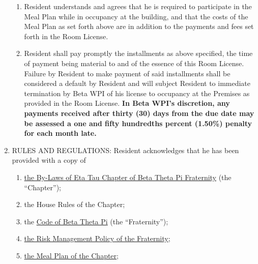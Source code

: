 \documentclass[12pt]{article}
\begin{document}
\begin{enumerate}
\begin{enumerate}[label=\Alph*.]
         \item Resident understands and agrees that he is required to participate in the Meal Plan while in occupancy at the building, and that the costs of the Meal Plan as set forth above are in addition to the payments and fees set forth in the Room License.

        \item Resident shall pay promptly the installments as above specified, the time of payment being material to and of the essence of this Room License.
Failure by Resident to make payment of said installments shall be considered a default by Resident and will subject Resident to immediate termination by Beta WPI of his license to occupancy at the Premises as provided in the Room License.
\textbf{In Beta WPI's discretion, any payments received after thirty (30) days from the due date may be assessed a one and fifty hundredths percent (1.50\%) penalty for each month late.}

\end{enumerate}

\item\label{itm:rules}

RULES AND REGULATIONS\@: Resident acknowledges that he has been provided with a copy of

\begin{enumerate}[label=\arabic*)]

        \item \href{https://docs.google.com/document/d/19zC4bDC3ZrdCWqLJ8Y0Z35mJEEDPLed1o6GGvX5XCGw/edit?usp=sharing} {the By-Laws of Eta Tau Chapter of Beta Theta Pi Fraternity} (the ``Chapter'');

        \item the House Rules of the Chapter;

        \item the \href{https://beta.org/wp-content/uploads/2020/08/Code-of-Beta-Theta-Pi_08.13.2020.pdf}{Code of Beta Theta Pi} (the ``Fraternity'');

        \item \href{https://beta.org/wp-content/uploads/2020/08/Beta-Theta-Pi-Risk-Management-Policy-August-2020.pdf}{the Risk Management Policy of the Fraternity};

        \item \href{https://docs.google.com/document/d/1TNQDLowFoC3HZo6kSRtdvaxXrOXnMxME0UXYeSga4I8/edit?usp=sharing}{the Meal Plan of the Chapter};

\end{enumerate}


\end{enumerate}
\end{document}
